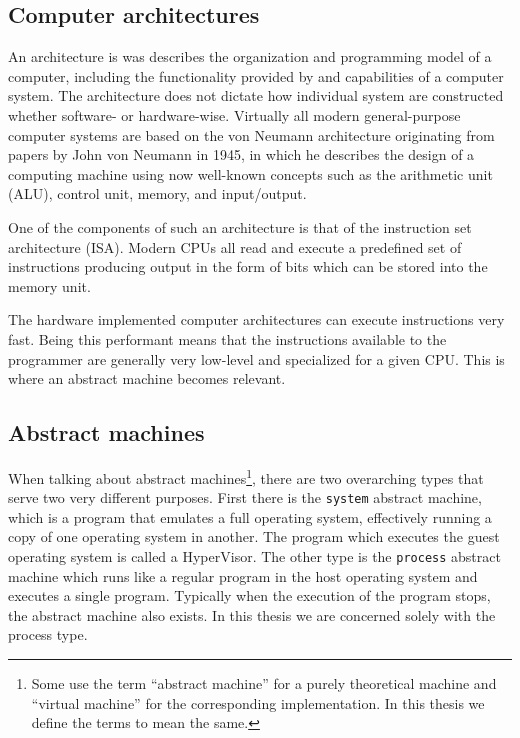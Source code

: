 
\subsection{Computer architectures}
\label{sec:background:computer-architectures}
An architecture is was describes the organization and programming model of a
computer, including the functionality provided by and capabilities of a computer
system\cite{clements06}. The architecture does not dictate how individual
system are constructed whether software- or hardware-wise. Virtually all modern
general-purpose computer systems are based on the von Neumann architecture
originating from papers by John von Neumann in 1945\cite{riley87}, in which he
describes the design of a computing machine using now well-known concepts such
as the arithmetic unit (ALU), control unit, memory, and input/output.

One of the components of such an architecture is that of the instruction set
architecture (ISA). Modern CPUs all read and execute a predefined set of
instructions producing output in the form of bits which can be stored into the
memory unit.

The hardware implemented computer architectures can execute instructions very
fast.\cite{NEEDED} Being this performant means that the instructions available
to the programmer are generally very low-level and specialized for a given
CPU. This is where an abstract machine becomes relevant.

\subsection{Abstract machines}
\label{sec:background:abstract-machines}

When talking about abstract machines\footnote{Some use the term ``abstract
  machine'' for a purely theoretical machine and ``virtual machine'' for the
  corresponding implementation. In this thesis we define the terms to mean the
  same.}, there are two overarching types that serve two very different
purposes. First there is the \texttt{system} abstract machine, which is a
program that emulates a full operating system, effectively running a copy of one
operating system in another. The program which executes the guest operating
system is called a HyperVisor\cite{NEEDED}. The other type is the
\texttt{process} abstract machine which runs like a regular program in the host
operating system and executes a single program. Typically when the execution of
the program stops, the abstract machine also exists. In this thesis we are
concerned solely with the process type.

